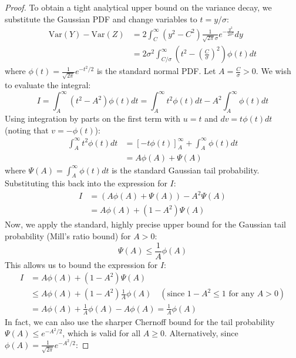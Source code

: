 \documentclass{article}
\theoremstyle{plain}
\theoremstyle{definition}
\theoremstyle{remark}
\begin{document}
\begin{proof}
To obtain a tight analytical upper bound on the variance decay, we substitute the Gaussian PDF and change variables to $t = y/\sigma$:
\begin{align}
    \text{Var}(Y) - \text{Var}(Z) &= 2 \int_{C}^{\infty} (y^2 - C^2) \frac{1}{\sqrt{2\pi}\sigma} e^{-\frac{y^2}{2\sigma^2}} dy \nonumber \\
    &= 2 \sigma^2 \int_{C/\sigma}^{\infty} \left( t^2 - \left(\frac{C}{\sigma}\right)^2 \right) \phi(t) dt
\end{align}
where $\phi(t) = \frac{1}{\sqrt{2\pi}} e^{-t^2 / 2}$ is the standard normal PDF.
Let $A = \frac{C}{\sigma} > 0$. We wish to evaluate the integral:
\begin{equation}
    I = \int_{A}^{\infty} (t^2 - A^2) \phi(t) dt = \int_{A}^{\infty} t^2 \phi(t) dt - A^2 \int_{A}^{\infty} \phi(t) dt
\end{equation}
Using integration by parts on the first term with $u = t$ and $dv = t \phi(t) dt$ (noting that $v = -\phi(t)$):
\begin{align}
    \int_{A}^{\infty} t^2 \phi(t) dt &= \left[ -t \phi(t) \right]_A^{\infty} + \int_{A}^{\infty} \phi(t) dt \nonumber \\
    &= A \phi(A) + \Psi(A)
\end{align}
where $\Psi(A) = \int_{A}^{\infty} \phi(t) dt$ is the standard Gaussian tail probability. Substituting this back into the expression for $I$:
\begin{align}
    I &= \left( A \phi(A) + \Psi(A) \right) - A^2 \Psi(A) \nonumber \\
    &= A \phi(A) + (1 - A^2) \Psi(A)
\end{align}
Now, we apply the standard, highly precise upper bound for the Gaussian tail probability (Mill's ratio bound) for $A > 0$:
\begin{equation}
    \Psi(A) \le \frac{1}{A} \phi(A)
\end{equation}
This allows us to bound the expression for $I$:
\begin{align}
    I &= A \phi(A) + (1 - A^2) \Psi(A) \nonumber \\
    &\le A \phi(A) + (1 - A^2) \frac{1}{A} \phi(A) \quad (\text{since } 1 - A^2 \le 1 \text{ for any } A > 0) \nonumber \\
    &= A \phi(A) + \frac{1}{A} \phi(A) - A \phi(A) = \frac{1}{A} \phi(A)
\end{align}
In fact, we can also use the sharper Chernoff bound for the tail probability $\Psi(A) \le e^{-A^2 / 2}$, which is valid for all $A \ge 0$. Alternatively, since $\phi(A) = \frac{1}{\sqrt{2\pi}} e^{-A^2/2}$:

\end{proof}
\end{document}
